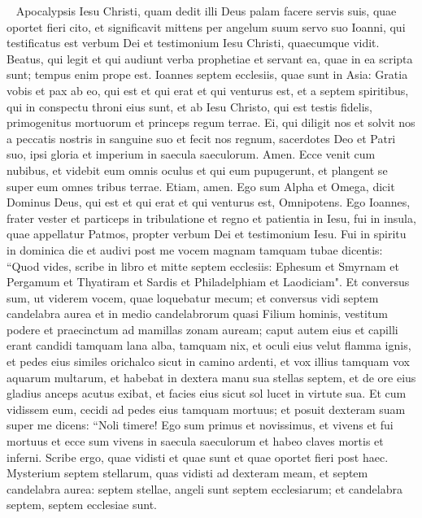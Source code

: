 
\begin{biblechapter}   
\verse Apocalypsis Iesu Christi, quam dedit illi Deus palam facere servis suis, quae oportet fieri cito, et significavit mittens per angelum suum servo suo Ioanni, 
\verse qui testificatus est verbum Dei et testimonium Iesu Christi, quaecumque vidit. 
\verse Beatus, qui legit et qui audiunt verba prophetiae et servant ea, quae in ea scripta sunt; tempus enim prope est. 
\verse Ioannes septem ecclesiis, quae sunt in Asia: Gratia vobis et pax ab eo, qui est et qui erat et qui venturus est, et a septem spiritibus, qui in conspectu throni eius sunt, 
\verse et ab Iesu Christo, qui est testis fidelis, primogenitus mortuorum et princeps regum terrae. Ei, qui diligit nos et solvit nos a peccatis nostris in sanguine suo 
\verse et fecit nos regnum, sacerdotes Deo et Patri suo, ipsi gloria et imperium in saecula saeculorum. Amen. 
\verse Ecce venit cum nubibus, et videbit eum omnis oculus et qui eum pupugerunt, et plangent se super eum omnes tribus terrae. Etiam, amen. 
\verse Ego sum Alpha et Omega, dicit Dominus Deus, qui est et qui erat et qui venturus est, Omnipotens. 
\verse Ego Ioannes, frater vester et particeps in tribulatione et regno et patientia in Iesu, fui in insula, quae appellatur Patmos, propter verbum Dei et testimonium Iesu. 
\verse Fui in spiritu in dominica die et audivi post me vocem magnam tamquam tubae 
\verse dicentis: “Quod vides, scribe in libro et mitte septem ecclesiis: Ephesum et Smyrnam et Pergamum et Thyatiram et Sardis et Philadelphiam et Laodiciam". 
\verse Et conversus sum, ut viderem vocem, quae loquebatur mecum; et conversus vidi septem candelabra aurea 
\verse et in medio candelabrorum quasi Filium hominis, vestitum podere et praecinctum ad mamillas zonam auream; 
\verse caput autem eius et capilli erant candidi tamquam lana alba, tamquam nix, et oculi eius velut flamma ignis, 
\verse et pedes eius similes orichalco sicut in camino ardenti, et vox illius tamquam vox aquarum multarum, 
\verse et habebat in dextera manu sua stellas septem, et de ore eius gladius anceps acutus exibat, et facies eius sicut sol lucet in virtute sua. 
\verse Et cum vidissem eum, cecidi ad pedes eius tamquam mortuus; et posuit dexteram suam super me dicens: “Noli timere! Ego sum primus et novissimus, 
\verse et vivens et fui mortuus et ecce sum vivens in saecula saeculorum et habeo claves mortis et inferni. 
\verse Scribe ergo, quae vidisti et quae sunt et quae oportet fieri post haec. 
\verse Mysterium septem stellarum, quas vidisti ad dexteram meam, et septem candelabra aurea: septem stellae, angeli sunt septem ecclesiarum; et candelabra septem, septem ecclesiae sunt. 
\end{biblechapter}

